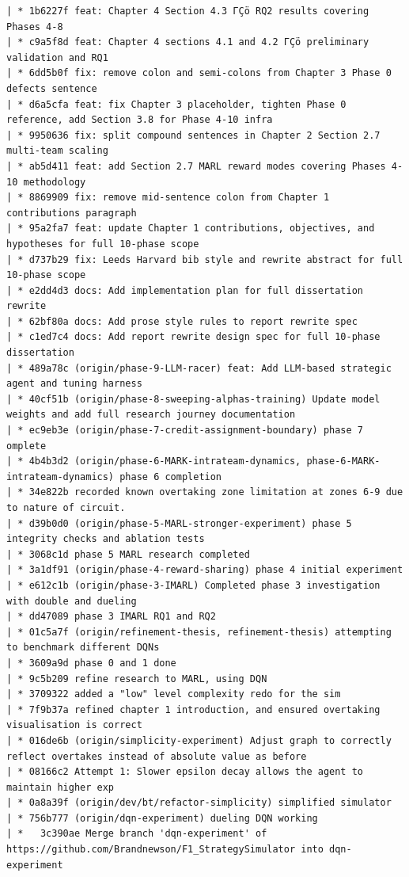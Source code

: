 \begin{appendices}
\begin{small}
\begin{verbatim}
| * 1b6227f feat: Chapter 4 Section 4.3 ΓÇö RQ2 results covering Phases 4-8
| * c9a5f8d feat: Chapter 4 sections 4.1 and 4.2 ΓÇö preliminary validation and RQ1
| * 6dd5b0f fix: remove colon and semi-colons from Chapter 3 Phase 0 defects sentence
| * d6a5cfa feat: fix Chapter 3 placeholder, tighten Phase 0 reference, add Section 3.8 for Phase 4-10 infra
| * 9950636 fix: split compound sentences in Chapter 2 Section 2.7 multi-team scaling
| * ab5d411 feat: add Section 2.7 MARL reward modes covering Phases 4-10 methodology
| * 8869909 fix: remove mid-sentence colon from Chapter 1 contributions paragraph
| * 95a2fa7 feat: update Chapter 1 contributions, objectives, and hypotheses for full 10-phase scope
| * d737b29 fix: Leeds Harvard bib style and rewrite abstract for full 10-phase scope
| * e2dd4d3 docs: Add implementation plan for full dissertation rewrite
| * 62bf80a docs: Add prose style rules to report rewrite spec
| * c1ed7c4 docs: Add report rewrite design spec for full 10-phase dissertation
| * 489a78c (origin/phase-9-LLM-racer) feat: Add LLM-based strategic agent and tuning harness
| * 40cf51b (origin/phase-8-sweeping-alphas-training) Update model weights and add full research journey documentation
| * ec9eb3e (origin/phase-7-credit-assignment-boundary) phase 7 omplete
| * 4b4b3d2 (origin/phase-6-MARK-intrateam-dynamics, phase-6-MARK-intrateam-dynamics) phase 6 completion
| * 34e822b recorded known overtaking zone limitation at zones 6-9 due to nature of circuit.
| * d39b0d0 (origin/phase-5-MARL-stronger-experiment) phase 5 integrity checks and ablation tests
| * 3068c1d phase 5 MARL research completed
| * 3a1df91 (origin/phase-4-reward-sharing) phase 4 initial experiment
| * e612c1b (origin/phase-3-IMARL) Completed phase 3 investigation with double and dueling
| * dd47089 phase 3 IMARL RQ1 and RQ2
| * 01c5a7f (origin/refinement-thesis, refinement-thesis) attempting to benchmark different DQNs
| * 3609a9d phase 0 and 1 done
| * 9c5b209 refine research to MARL, using DQN
| * 3709322 added a "low" level complexity redo for the sim
| * 7f9b37a refined chapter 1 introduction, and ensured overtaking visualisation is correct
| * 016de6b (origin/simplicity-experiment) Adjust graph to correctly reflect overtakes instead of absolute value as before
| * 08166c2 Attempt 1: Slower epsilon decay allows the agent to maintain higher exp
| * 0a8a39f (origin/dev/bt/refactor-simplicity) simplified simulator
| * 756b777 (origin/dqn-experiment) dueling DQN working
| *   3c390ae Merge branch 'dqn-experiment' of https://github.com/Brandnewson/F1_StrategySimulator into dqn-experiment

\end{verbatim}
\end{small}
\end{appendices}
